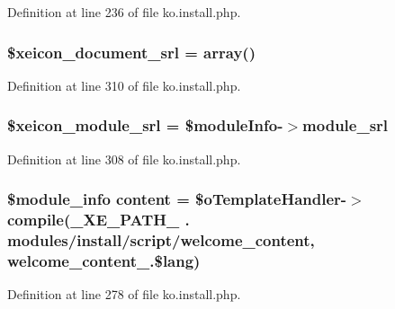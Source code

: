Definition at line 236 of file ko.\+install.\+php.

\hypertarget{ko_8install_8php_a41d95a71ebf0758e83224ab4bb3a31c0}{}
\subsubsection[{\$xeicon\+\_\+document\+\_\+srl}]{\setlength{\rightskip}{0pt plus 5cm}\$xeicon\+\_\+document\+\_\+srl = array()}\label{ko_8install_8php_a41d95a71ebf0758e83224ab4bb3a31c0}


Definition at line 310 of file ko.\+install.\+php.

\hypertarget{ko_8install_8php_acf278a9931e1d1ea52b045c0fa42b9b3}{}
\subsubsection[{\$xeicon\+\_\+module\+\_\+srl}]{\setlength{\rightskip}{0pt plus 5cm}\$xeicon\+\_\+module\+\_\+srl = \$module\+Info-\/$>${\bf module\+\_\+srl}}\label{ko_8install_8php_acf278a9931e1d1ea52b045c0fa42b9b3}


Definition at line 308 of file ko.\+install.\+php.

\hypertarget{ko_8install_8php_a65dddc3e5e47cb506e6b5417ffb3bdef}{}
\subsubsection[{content}]{\setlength{\rightskip}{0pt plus 5cm}\$module\+\_\+info {\bf content} = \$o\+Template\+Handler-\/$>$compile({\bf \+\_\+\+X\+E\+\_\+\+P\+A\+T\+H\+\_\+} . \textquotesingle{}modules/{\bf install}/script/welcome\+\_\+content\textquotesingle{}, \textquotesingle{}welcome\+\_\+content\+\_\+\textquotesingle{}.\$lang)}\label{ko_8install_8php_a65dddc3e5e47cb506e6b5417ffb3bdef}


Definition at line 278 of file ko.\+install.\+php.

\hypertarget{ko_8install_8php_a1dffea0d5ba8194f8ef01f414af0c831}{}
